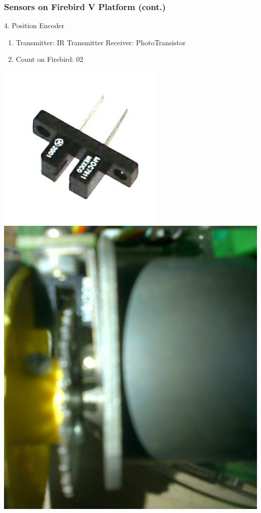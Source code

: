 \documentclass[10pt,red]{beamer}
\begin{document}
\begin{frame}
	\frametitle{Sensors on Firebird V Platform (cont.)} 
	4. Position Encoder	\pause
		\vfill
		\begin{minipage}[c]{0.5\textwidth}
			\begin{enumerate}
				\item <+-|alert@+> Transmitter: IR Transmitter  \qquad Receiver: PhotoTransistor \\[10pt]
				\item <+-|alert@+> Count on Firebird: 02 \\[10pt]
			\end{enumerate}
		\end{minipage}
		\hfill
		\begin{minipage}[c]{0.4\textwidth}
			\includegraphics[width=0.6\linewidth]{Position_encoder}
		\vfill
			\includegraphics[width=0.6\linewidth]{encoder_on_fb}
		\end{minipage}	
\end{frame}	
\end{document}
